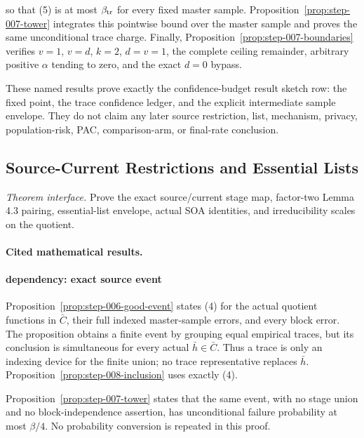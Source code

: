so that (5) is at most \(\beta_{\rm tr}\) for every fixed master sample.
Proposition~\ref{prop:step-007-tower} integrates this pointwise bound over
the master sample and proves the same unconditional trace charge. Finally,
Proposition~\ref{prop:step-007-boundaries} verifies \(v=1\), \(v=d\),
\(k=2\), \(d=v=1\), the complete ceiling remainder, arbitrary positive
\(\alpha\) tending to zero, and the exact \(d=0\) bypass.

These named results prove exactly the confidence-budget result sketch row: the fixed point,
the trace confidence ledger, and the explicit intermediate sample envelope.
They do not claim any later source restriction, list, mechanism, privacy,
population-risk, PAC, comparison-arm, or final-rate conclusion.



\subsection{Source-Current Restrictions and Essential Lists}\label{app:step_008}

\noindent\textit{Theorem interface.} Prove the exact source/current stage map, factor-two   Lemma 4.3 pairing, essential-list envelope, actual SOA identities, and   irreducibility scales on the quotient.

\paragraph{Cited mathematical results.}


\paragraph{dependency: exact source event}

Proposition~\ref{prop:step-006-good-event} states (4) for the
actual quotient functions in \(\bar C\), their full indexed master-sample
errors, and every block error. The proposition obtains a finite event by
grouping equal empirical traces, but its conclusion is simultaneous for
every actual \(\bar h\in\bar C\). Thus a trace is only an indexing device
for the finite union; no trace representative replaces \(\bar h\).
Proposition~\ref{prop:step-008-inclusion} uses exactly (4).

Proposition~\ref{prop:step-007-tower} states that the same event,
with no stage union and no block-independence assertion, has unconditional
failure probability at most \(\beta/4\). No probability conversion is
repeated in this proof.

